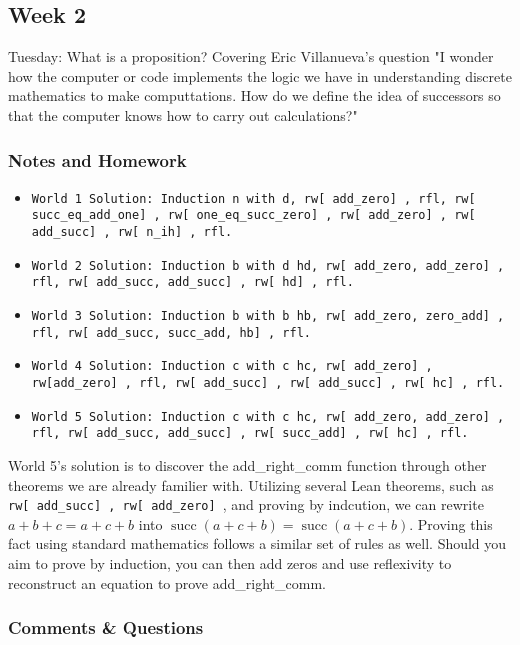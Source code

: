 \documentclass{article}
\DeclareMathOperator{\successor}{succ}
\theoremstyle{theorem}
\theoremstyle{definition}
\theoremstyle{remark}
\begin{document}
\subsection{Week 2}

Tuesday: What is a proposition? Covering Eric Villanueva's question "I wonder how the computer or code implements the logic we have in understanding discrete mathematics to make computtations. How do we define the idea of successors so that the computer knows how to carry out calculations?"

\subsubsection*{Notes and Homework}

\begin{itemize}
  \item \texttt{World 1 Solution: Induction n with d, rw[\,add\_zero]\,, rfl, rw[\,succ\_eq\_add\_one]\,, rw[\,one\_eq\_succ\_zero]\,, rw[\,add\_zero]\,, rw[\,add\_succ]\,, rw[\,n\_ih]\,, rfl.}
  \item \texttt{World 2 Solution: Induction b with d hd, rw[\,add\_zero, add\_zero]\,, rfl, rw[\,add\_succ, add\_succ]\,, rw[\,hd]\,, rfl.}
  \item \texttt{World 3 Solution: Induction b with b hb, rw[\,add\_zero, zero\_add]\,, rfl, rw[\,add\_succ, succ\_add, hb]\,, rfl.}
  \item \texttt{World 4 Solution: Induction c with c hc, rw[\,add\_zero]\,, rw[add\_zero]\,, rfl, rw[\,add\_succ]\,, rw[\,add\_succ]\,, rw[\,hc]\,, rfl.}
  \item \texttt{World 5 Solution: Induction c with c hc, rw[\,add\_zero, add\_zero]\,, rfl, rw[\,add\_succ, add\_succ]\,, rw[\,succ\_add]\,, rw[\,hc]\,, rfl.}
\end{itemize}

World 5's solution is to discover the add\_right\_comm function through other theorems we are already familier with. Utilizing several Lean theorems, such as \texttt{rw[\,add\_succ]\,, rw[\,add\_zero]\,}, and proving by indcution, we can rewrite $a+b+c = a+c+b$ into $\successor (a+c+b) = \successor  (a+c+b)$. Proving this fact using standard mathematics follows a similar set of rules as well. Should you aim to prove by induction, you can then add zeros and use reflexivity to reconstruct an equation to prove add\_right\_comm.


\subsubsection*{Comments \& Questions}
\end{document}
